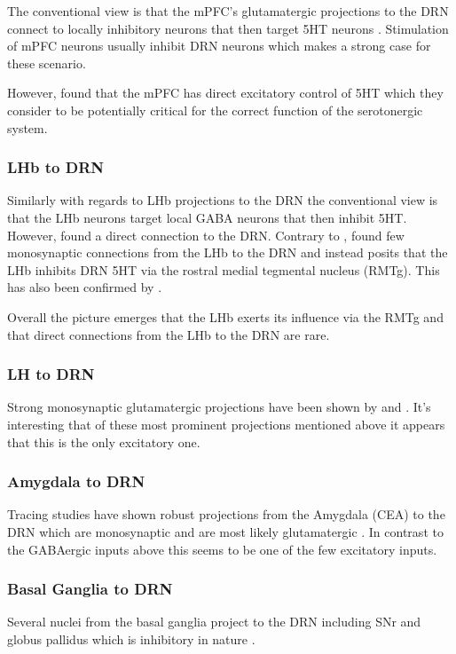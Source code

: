 \documentclass[12pt,a4paper]{article}
\begin{document}
The conventional view is that the mPFC’s glutamatergic projections to
the DRN connect to locally inhibitory neurons that then target 5HT
neurons \citep{Celada2001}. Stimulation of mPFC neurons usually
inhibit DRN neurons which makes a strong case for these scenario.

However, \citep{PollakDorocic2014} found that the mPFC has direct
excitatory control of 5HT which they consider to be potentially
critical for the correct function of the serotonergic system.

\subsubsection{LHb to DRN}
Similarly with regards to LHb projections to the DRN the conventional
view is that the LHb neurons target local GABA neurons that then
inhibit 5HT. However, \citep{PollakDorocic2014} found a direct
connection to the DRN. Contrary to \citep{PollakDorocic2014},
\citep{Ogawa2014} found few monosynaptic connections from the LHb to
the DRN and instead posits that the LHb inhibits DRN 5HT via the
rostral medial tegmental nucleus (RMTg). This has also been confirmed
by \citep{Sego2014}.

Overall the picture emerges that the LHb exerts its influence via the
RMTg and that direct connections from the LHb to the DRN are rare.

\subsubsection{LH to DRN}
Strong monosynaptic glutamatergic projections have been shown by
\citep{Lee2003} and \citep{Aghajanian1990}. It's interesting that of
these most prominent projections mentioned above it appears that this
is the only excitatory one.

\subsubsection{Amygdala to DRN}
Tracing studies have shown robust projections from the Amygdala (CEA)
to the DRN \citep{PollakDorocic2014} which are monosynaptic and are
most likely glutamatergic \citep{Swanson1998}. In contrast to the
GABAergic inputs above this seems to be one of the few excitatory
inputs.

\subsubsection{Basal Ganglia to DRN}
Several nuclei from the basal ganglia project to the DRN including SNr
and globus pallidus which is inhibitory in nature
\citep{PollakDorocic2014}.
\end{document}
